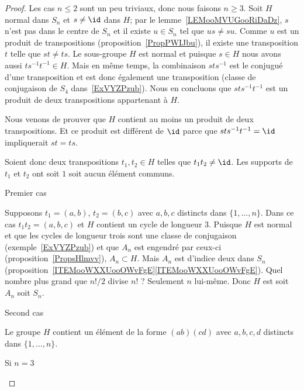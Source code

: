 \begin{proof}
    Les cas \( n\leq 2\) sont un peu triviaux, donc nous faisons \( n\geq 3\). Soit \( H\) normal dans \( S_n\) et \( s\neq \id\) dans \( H\); par le lemme~\ref{LEMooMVUGooRiDaDz}, \( s\) n'est pas dans le centre de \( S_n\) et il existe \( u\in S_n\) tel que \( us\neq su\). Comme \( u\) est un produit de transpositions (proposition~\ref{PropPWIJbu}), il existe une transposition \( t\) telle que \( st\neq ts\). Le sous-groupe \( H\) est normal et puisque \( s\in H\) nous avons aussi \( ts^{-1}t^{-1}\in H\). Mais en même temps, la combinaison \( sts^{-1}\) est le conjugué d'une transposition et est donc également une transposition (classe de conjugaison de \( S_4\) dans~\ref{ExVYZPzub}). Nous en concluons que \( sts^{-1}t^{-1}\) est un produit de deux transpositions appartenant à \( H\).

    Nous venons de prouver que \( H\) contient au moins un produit de deux transpositions. Et ce produit est différent de \( \id\) parce que \( sts^{-1}t^{-1}=\id\) impliquerait \( st=ts\).

    Soient donc deux transpositions \( t_1,t_2\in H\) telles que \( t_1t_2\neq \id\). Les supports de \( t_1\) et \( t_2\) ont soit \( 1\) soit aucun élément communs.

    \begin{subproof}
        \item[Premier cas]

            Supposons \( t_1=(a,b)\), \( t_2=(b,c)\) avec \( a,b,c\) distincts dans \( \{ 1,\ldots, n \}\). Dans ce cas \( t_1t_2=(a,b,c)\) et \( H\) contient un cycle de longueur \( 3\). Puisque \( H\) est normal et que les cycles de longueur trois sont une classe de conjugaison (exemple~\ref{ExVYZPzub}) et que \( A_n\) est engendré par ceux-ci (proposition~\ref{PropsHlmvv}), \( A_n\subset H\). Mais \( A_n\) est d'indice deux dans \( S_n\) (proposition~\ref{ITEMooWXXUooOWvFgE}\ref{ITEMooWXXUooOWvFgE}). Quel nombre plus grand que \( n!/2\) divise \( n!\) ? Seulement \( n\) lui-même. Donc \( H\) est soit \( A_n\) soit \( S_n\).

        \item[Second cas]

            Le groupe \( H\) contient un élément de la forme \( (ab)(cd)\) avec \( a,b,c,d\) distincts dans \( \{ 1,\ldots, n \}\).

            \begin{subproof}

                \item[Si \( n=3\)]


\end{subproof}
\end{subproof}
\end{proof}
